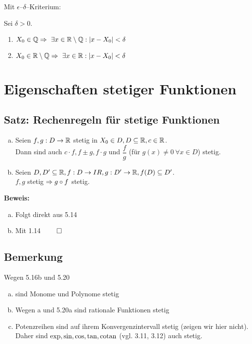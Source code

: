 \documentclass[10pt, a4paper, fleqn]{article}
\begin{document}
\begin{enumerate}[a)]
    Mit $\epsilon$--$\delta$--Kriterium:

    Sei $\delta > 0$.
    \begin{enumerate}[1.]
        \item $X_0 \in \mathbb{Q} \Rightarrow \ \exists x \in \mathbb{R} \setminus \mathbb{Q}: |x-X_0| < \delta$
        \item $X_0 \in \IR \setminus \IQ \imp \ \exists x \in \IR: |x-X_0| < \delta$
    \end{enumerate}
\end{enumerate}

\section*{Eigenschaften stetiger Funktionen}
\subsection{Satz: Rechenregeln für stetige Funktionen}

\begin{enumerate}[a)]
    \item Seien $f, g: D \to \mathbb{R}$ stetig in $X_0 \in D, D \subseteq \mathbb{R}, c \in \mathbb{R}$. \\
    Dann sind auch $c \cdot f, f \pm g, f \cdot g$ und $ \dfrac{f}{g}$ 
    (für $g(x) \neq 0 \ \forall x \in D$) stetig.

    \item Seien $D, D' \subseteq \mathbb{R}, f: D \to IR, g: D' \to \mathbb{R}, f(D) \subseteq D'$. \\
    $f, g$ stetig $\Rightarrow g \circ f$ stetig.
\end{enumerate}

\textbf{Beweis: }
\begin{enumerate}[a)]
    \item Folgt direkt aus 5.14
    \item Mit 1.14 $\qed$
\end{enumerate}

\subsection{Bemerkung}
Wegen 5.16b und 5.20
\begin{enumerate}[a)]
    \item sind Monome und Polynome stetig
    \item Wegen a und 5.20a sind rationale Funktionen stetig
    \item Potenzreihen sind auf ihrem Konvergenzintervall stetig (zeigen wir hier nicht).
    Daher sind $\exp, \sin, \cos, \tan, \text{cotan}$ (vgl. 3.11, 3.12) auch stetig.
\end{enumerate}
\end{document}
